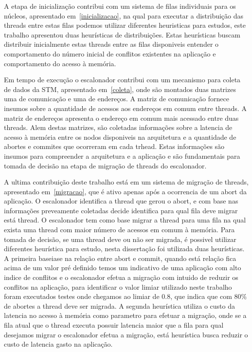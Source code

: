 \documentclass[diss,capa]{texufpel}
\begin{document}
A etapa de inicialização contribui com um sistema de filas individuais para os núcleos, apresentado em~\ref{inicializacao}, na qual para executar a distribuição das threads entre estas filas podemos utilizar diferentes heuristicas para estudos, este trabalho apresentou duas heurísticas de distribuições. Estas heurísticas buscam distribuir inicialmente estas threads entre as filas disponiveis entender o comportamento do número inicial de conflitos existentes na aplicação e comportamento do acesso à memória.

Em tempo de execução o escalonador contribui com um mecanismo para coleta de dados da STM, apresentado em~\ref{coleta}, onde são montados duas matrizes uma de comunicação e uma de endereços. A matriz de comunicação fornece insumos sobre a quantidade de acessos aos endereços em comum entre threads. A matriz de endereços apresenta o endereço em comum mais acessado entre duas threads. Alem destas matrizes, são coletadas informações sobre a latencia de acesso à memória entre os nodos disponiveis na arquitetura e a quantidade de abortes e commites que ocorreram em cada trhead. Estas informações são insumos para compreender a arquitetura e a aplicação e são fundamentais para tomada de decisão na etapa de migração de threads do escalonador.

A ultima contribuição deste trabalho está em um sistema de migração de threads, apresentado em~\ref{migracao}, que é ativo apenas após a ocorrencia de um abort da aplicação. O escalonador identifica a thread que gerou o abort, e com base nas informações preveamente coletadas decide identifica para qual fila deve migrar está thread. O escalonador tem como base migrar a thread para uma fila na qual exista uma thread com maior número de acessos em comum à memória. Para tomada de decisão, se uma thread deve ou não ser migrada, é possivel utilizar diferentes heurística para estudo, nesta dissertação foi utilizada duas heurísticas. A primeira baseiase na relação entre abort e commit, quando está relação fica acima de um valor pré definido temos um indicativo de uma aplicação com alto indice de conflitos e o escalonador efetua a migração com intuido de reduzir os conflitos na aplicação, para identificar o valor limiar utilizado neste trabalho foram executados testes onde chegamos ao limiar de 0.8, que indica que com 80\% de abortes a thread deve ser migrada. A segunda heurística utiliza o custo da latencia no acesso à memória como parametro para efetuar a migração, onde se a fila atual que o thread executa possuir latencia maior que a fila para qual desejamos migrar o escalonador efetua a migração, está heurística busca reduzir o custo de latencia gasto na aplicação.
\end{document}
